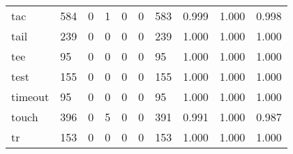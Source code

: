 \begin{longtable}{lp{1.3cm}p{1.3cm}p{1.3cm}p{1.3cm}p{1.3cm}p{1.3cm}p{1.3cm}p{1.3cm}p{1.3cm}}
tac       &                    584 &                                             0 &                                            1 &                                           0 &                                            0 &                                        583 &                                0.999 &                                  1.000 &                                0.998 \\
tail      &                    239 &                                             0 &                                            0 &                                           0 &                                            0 &                                        239 &                                1.000 &                                  1.000 &                                1.000 \\
tee       &                     95 &                                             0 &                                            0 &                                           0 &                                            0 &                                         95 &                                1.000 &                                  1.000 &                                1.000 \\
test      &                    155 &                                             0 &                                            0 &                                           0 &                                            0 &                                        155 &                                1.000 &                                  1.000 &                                1.000 \\
timeout   &                     95 &                                             0 &                                            0 &                                           0 &                                            0 &                                         95 &                                1.000 &                                  1.000 &                                1.000 \\
touch     &                    396 &                                             0 &                                            5 &                                           0 &                                            0 &                                        391 &                                0.991 &                                  1.000 &                                0.987 \\
tr        &                    153 &                                             0 &                                            0 &                                           0 &                                            0 &                                        153 &                                1.000 &                                  1.000 &                                1.000 \\

\end{longtable}
